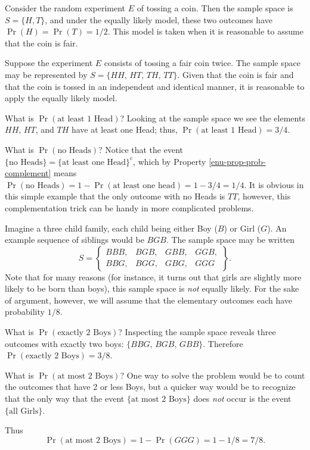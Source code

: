 \documentclass[captions=tableheading]{scrbook}
\begin{document}
\begin{example}
Consider the random experiment \(E\) of tossing a coin. Then the sample space is \(S=\{H,T\}\), and under the equally likely model, these two outcomes have \(\Pr(H)=\Pr(T)=1/2\). This model is taken when it is reasonable to assume that the coin is fair.
\end{example}

\begin{example}
Suppose the experiment \(E\) consists of tossing a fair coin twice. The sample space may be represented by \(S=\{HH,\, HT,\, TH,\, TT\}\). Given that the coin is fair and that the coin is tossed in an independent and identical manner, it is reasonable to apply the equally likely model. 

What is \(\Pr(\mbox{at least 1 Head})\)? Looking at the sample space we see the elements \(HH\), \(HT\), and \(TH\) have at least one Head; thus, \(\Pr(\mbox{at least 1 Head})=3/4\). 

What is \(\Pr(\mbox{no Heads})\)? Notice that the event \(\{ \mbox{no Heads} \} = \{ \mbox{at least one Head} \} ^{c}\), which by Property \ref{enu-prop-prob-complement} means \(\Pr(\mbox{no Heads})=1-\Pr(\mbox{at least one head})=1-3/4=1/4\). It is obvious in this simple example that the only outcome with no Heads is \(TT\), however, this complementation trick can be handy in more complicated problems.
\end{example}

\begin{example}
Imagine a three child family, each child being either Boy (\(B\)) or Girl (\(G\)). An example sequence of siblings would be \(BGB\). The sample space may be written
\[
S=\left\{ 
\begin{array}{cccc}
BBB, & BGB, & GBB, & GGB,\\
BBG, & BGG, & GBG, & GGG
\end{array}
\right\}.
\]
Note that for many reasons (for instance, it turns out that girls are slightly more likely to be born than boys), this sample space is \emph{not} equally likely. For the sake of argument, however, we will assume that the elementary outcomes each have probability \(1/8\).

What is \(\Pr(\mbox{exactly 2 Boys})\)? Inspecting the sample space reveals three outcomes with exactly two boys: \( \{ BBG,\, BGB,\, GBB \} \).  Therefore \(\Pr(\mbox{exactly 2 Boys})=3/8\). 

What is \(\Pr(\mbox{at most 2 Boys})\)? One way to solve the problem would be to count the outcomes that have 2 or less Boys, but a quicker way would be to recognize that the only way that the event \(\{ \mbox{at most 2 Boys} \}\) does \emph{not} occur is the event \(\{ \mbox{all Girls} \}\).

Thus
\[
\Pr(\mbox{at most 2 Boys})=1-\Pr(GGG)=1-1/8=7/8.
\]

\end{example}
\end{document}
